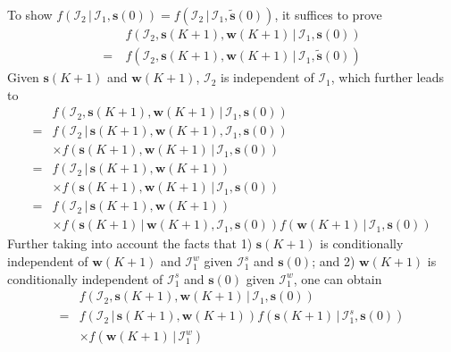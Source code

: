 \documentclass{IEEEtran}
\begin{document}
To show $f(\mathcal{I}_2 \, | \, \mathcal{I}_1, \mathbf{s}(0))= f(\mathcal{I}_2 \, | \, \mathcal{I}_1, \tilde{\mathbf{s}}(0))$, it suffices to prove
\begin{equation}
	\begin{aligned}
		& f(\mathcal{I}_2, \mathbf{s}(K+1), \mathbf{w}(K+1) \, | \, \mathcal{I}_1, \mathbf{s}(0))\\
		= \ & f(\mathcal{I}_2, \mathbf{s}(K+1), \mathbf{w}(K+1) \, | \, \mathcal{I}_1, \tilde{\mathbf{s}}(0))
	\end{aligned} 
\end{equation}
Given $\mathbf{s}(K+1)$ and $\mathbf{w}(K+1)$, $\mathcal{I}_2$ is independent of $\mathcal{I}_1$, which further leads to
\begin{equation}
	\begin{aligned}
		& f(\mathcal{I}_2, \mathbf{s}(K+1), \mathbf{w}(K+1) \, | \, \mathcal{I}_1, \mathbf{s}(0)) \\
		= & f(\mathcal{I}_2 \, | \, \mathbf{s}(K+1), \mathbf{w}(K+1), \mathcal{I}_1, \mathbf{s}(0)) \\ 
		& \times f(\mathbf{s}(K+1), \mathbf{w}(K+1) \, | \, \mathcal{I}_1, \mathbf{s}(0)) \\
		= & f(\mathcal{I}_2 \, | \, \mathbf{s}(K+1), \mathbf{w}(K+1)) \\
		& \times f(\mathbf{s}(K+1), \mathbf{w}(K+1) \, | \, \mathcal{I}_1, \mathbf{s}(0)) \\
		= & f(\mathcal{I}_2 \, | \, \mathbf{s}(K+1), \mathbf{w}(K+1)) \\
		& \times f(\mathbf{s}(K+1) \, | \, \mathbf{w}(K+1), \mathcal{I}_1, \mathbf{s}(0)) f(\mathbf{w}(K+1) \, | \, \mathcal{I}_1, \mathbf{s}(0))
	\end{aligned} 
\end{equation}
Further taking into account the facts that 1) $\mathbf{s}(K+1)$ is conditionally independent of $\mathbf{w}(K+1)$ and $\mathcal{I}_1^w$ given $\mathcal{I}_1^s$ and $\mathbf{s}(0)$; and 2) $\mathbf{w}(K+1)$ is conditionally independent of $\mathcal{I}_1^s$ and $\mathbf{s}(0)$ given $\mathcal{I}_1^w$, one can obtain
\begin{equation}
	\begin{aligned}
		& f(\mathcal{I}_2, \mathbf{s}(K+1), \mathbf{w}(K+1) \, | \, \mathcal{I}_1, \mathbf{s}(0)) \\
		= & f(\mathcal{I}_2 \, | \, \mathbf{s}(K+1), \mathbf{w}(K+1)) f(\mathbf{s}(K+1) \, | \, \mathcal{I}_1^s, \mathbf{s}(0)) \\
		& \times f(\mathbf{w}(K+1) \, | \, \mathcal{I}_1^w)
	\end{aligned} 
\end{equation}
\end{document}
